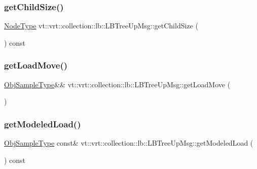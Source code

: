 \subsubsection{\texorpdfstring{get\+Child\+Size()}{getChildSize()}}
{\footnotesize\ttfamily \hyperlink{namespacevt_a866da9d0efc19c0a1ce79e9e492f47e2}{Node\+Type} vt\+::vrt\+::collection\+::lb\+::\+L\+B\+Tree\+Up\+Msg\+::get\+Child\+Size (\begin{DoxyParamCaption}{ }\end{DoxyParamCaption}) const\hspace{0.3cm}{\ttfamily [inline]}}

\mbox{\label{structvt_1_1vrt_1_1collection_1_1lb_1_1_l_b_tree_up_msg_aa5c9744fbb8557e3ec37846d9c8e09e7}} 
\subsubsection{\texorpdfstring{get\+Load\+Move()}{getLoadMove()}}
{\footnotesize\ttfamily \hyperlink{structvt_1_1vrt_1_1collection_1_1lb_1_1_hier_l_b_types_a597a60d517207b90e8c7984eac434e8f}{Obj\+Sample\+Type}\&\& vt\+::vrt\+::collection\+::lb\+::\+L\+B\+Tree\+Up\+Msg\+::get\+Load\+Move (\begin{DoxyParamCaption}{ }\end{DoxyParamCaption})\hspace{0.3cm}{\ttfamily [inline]}}

\mbox{\label{structvt_1_1vrt_1_1collection_1_1lb_1_1_l_b_tree_up_msg_a2ab64313485fc6b4b091c1a7a0b94aa1}} 
\subsubsection{\texorpdfstring{get\+Modeled\+Load()}{getModeledLoad()}}
{\footnotesize\ttfamily \hyperlink{structvt_1_1vrt_1_1collection_1_1lb_1_1_hier_l_b_types_a597a60d517207b90e8c7984eac434e8f}{Obj\+Sample\+Type} const\& vt\+::vrt\+::collection\+::lb\+::\+L\+B\+Tree\+Up\+Msg\+::get\+Modeled\+Load (\begin{DoxyParamCaption}{ }\end{DoxyParamCaption}) const\hspace{0.3cm}{\ttfamily [inline]}}

